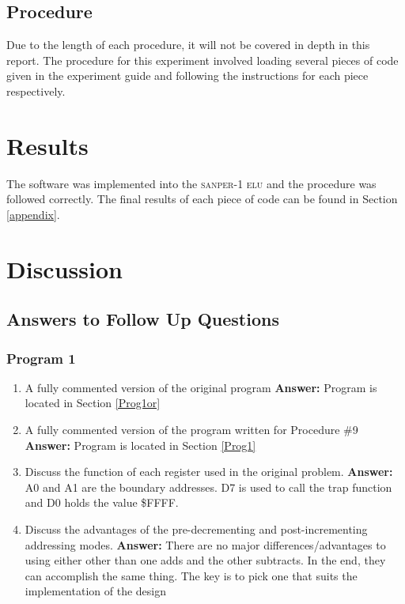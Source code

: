 \documentclass[12pt, twocolumn]{article}
\begin{document}
\subsection{Procedure}
Due to the length of each procedure, it will not be covered in depth in this report. The procedure for this experiment involved loading several pieces of code given in the experiment guide and following the instructions for each piece respectively.
\section{Results}
The software was implemented into the \textsc{sanper-1 elu} and the procedure was followed correctly. The final results of each piece of code can be found in Section \ref{appendix}.
\section{Discussion}
\subsection{Answers to Follow Up Questions}
\subsubsection{Program 1}
\begin{enumerate}
	\item A fully commented version of the original program
	\subitem \hspace{-0.7cm}\textbf{Answer:} Program is located in Section \ref{Prog1or}
	\item A fully commented version of the program written for Procedure \#9
	\subitem \hspace{-0.7cm}\textbf{Answer:} Program is located in Section \ref{Prog1}
	\item Discuss the function of each register used in the original problem.
	\subitem \hspace{-0.7cm}\textbf{Answer:} A0 and A1 are the boundary addresses. D7 is used to call the trap function and D0 holds the value \$FFFF. 
	\item Discuss the advantages of the pre-decrementing and post-incrementing addressing modes.
	\subitem \hspace{-0.7cm}\textbf{Answer:} There are no major differences/advantages to using either other than one adds and the other subtracts. In the end, they can accomplish the same thing. The key is to pick one that suits the implementation of the design
\end{enumerate}
\end{document}
